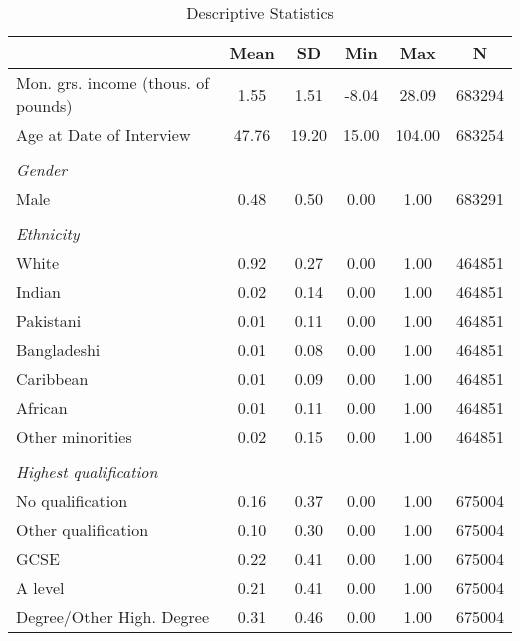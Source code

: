 {
\begin{longtable}{l*{1}{ccccc}}
\caption{Descriptive Statistics\label{descriptive}}\\
\toprule\endfirsthead\midrule\endhead\midrule\endfoot\endlastfoot
                &     Mean&       SD&      Min&      Max&        N\\
\midrule
Mon. grs. income (thous. of pounds)&     1.55&     1.51&    -8.04&    28.09&   683294\\
Age at Date of Interview&    47.76&    19.20&    15.00&   104.00&   683254\\
\vspace{0.05 cm} \\ \emph{Gender}&         &         &         &         &         \\
Male            &     0.48&     0.50&     0.00&     1.00&   683291\\
\vspace{0.05 cm} \\ \emph{Ethnicity}&         &         &         &         &         \\
White           &     0.92&     0.27&     0.00&     1.00&   464851\\
Indian          &     0.02&     0.14&     0.00&     1.00&   464851\\
Pakistani       &     0.01&     0.11&     0.00&     1.00&   464851\\
Bangladeshi     &     0.01&     0.08&     0.00&     1.00&   464851\\
Caribbean       &     0.01&     0.09&     0.00&     1.00&   464851\\
African         &     0.01&     0.11&     0.00&     1.00&   464851\\
Other minorities&     0.02&     0.15&     0.00&     1.00&   464851\\
\vspace{0.05 cm} \\ \emph{Highest qualification}&         &         &         &         &         \\
No qualification&     0.16&     0.37&     0.00&     1.00&   675004\\
Other qualification&     0.10&     0.30&     0.00&     1.00&   675004\\
GCSE            &     0.22&     0.41&     0.00&     1.00&   675004\\
A level         &     0.21&     0.41&     0.00&     1.00&   675004\\
Degree/Other High. Degree&     0.31&     0.46&     0.00&     1.00&   675004\\

\end{longtable}}
